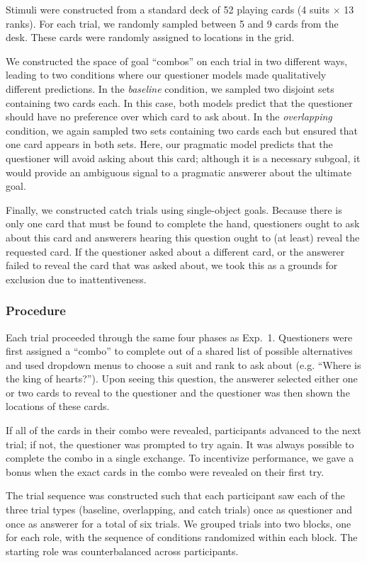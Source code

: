\documentclass[11pt, floatsintext]{apa6}
\begin{document}
Stimuli were constructed from a standard deck of 52 playing cards (4 suits $\times$ 13 ranks). 
For each trial, we randomly sampled between 5 and 9 cards from the desk. 
These cards were randomly assigned to locations in the grid. 

We constructed the space of goal ``combos'' on each trial in two different ways, leading to two conditions where our questioner models made qualitatively different predictions.
In the \emph{baseline} condition, we sampled two disjoint sets containing two cards each. 
In this case, both models predict that the questioner should have no preference over which card to ask about.
In the \emph{overlapping} condition, we again sampled two sets containing two cards each but ensured that one card appears in both sets. 
Here, our pragmatic model predicts that the questioner will avoid asking about this card; although it is a necessary subgoal, it would provide an ambiguous signal to a pragmatic answerer about the ultimate goal.

Finally, we constructed catch trials using single-object goals. 
Because there is only one card that must be found to complete the hand, questioners ought to ask about this card and answerers hearing this question ought to (at least) reveal the requested card.
If the questioner asked about a different card, or the answerer failed to reveal the card that was asked about, we took this as a grounds for exclusion due to inattentiveness.

\subsubsection{Procedure}

Each trial proceeded through the same four phases as Exp.~1. 
Questioners were first assigned a ``combo'' to complete out of a shared list of possible alternatives and used dropdown menus to choose a suit and rank to ask about (e.g. ``Where is the king of hearts?'').
Upon seeing this question, the answerer selected either one or two cards to reveal to the questioner and the questioner was then shown the locations of these cards.

If all of the cards in their combo were revealed, participants advanced to the next trial; if not, the questioner was prompted to try again.
It was always possible to complete the combo in a single exchange.
To incentivize performance, we gave a bonus when the exact cards in the combo were revealed on their first try. 

The trial sequence was constructed such that each participant saw each of the three trial types (baseline, overlapping, and catch trials) once as questioner and once as answerer for a total of six trials.
We grouped trials into two blocks, one for each role, with the sequence of conditions randomized within each block.
The starting role was counterbalanced across participants.
\end{document}
